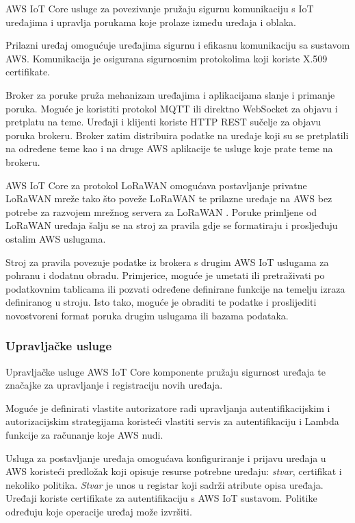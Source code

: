 AWS IoT Core usluge za povezivanje pružaju sigurnu komunikaciju s IoT uređajima i upravlja porukama koje prolaze između uređaja i oblaka.

Prilazni uređaj omogućuje uređajima sigurnu i efikasnu komunikaciju sa sustavom AWS. Komunikacija je osigurana sigurnosnim protokolima koji koriste  X.509 certifikate. 

Broker za poruke pruža mehanizam uređajima i aplikacijama slanje i primanje poruka. Moguće je koristiti protokol MQTT ili direktno WebSocket za objavu i pretplatu na teme. Uređaji i klijenti koriste HTTP REST sučelje za objavu poruka brokeru. Broker zatim distribuira podatke na uređaje koji su se pretplatili na određene teme kao i na druge AWS aplikacije te usluge koje prate teme na brokeru.

AWS IoT Core za protokol LoRaWAN omogućava postavljanje privatne LoRaWAN mreže tako što poveže LoRaWAN te prilazne uređaje na AWS bez potrebe za razvojem mrežnog servera za LoRaWAN . Poruke primljene od LoRaWAN uređaja šalju se na stroj za pravila  gdje se formatiraju i prosljeđuju ostalim AWS uslugama.

Stroj za pravila povezuje podatke iz brokera s drugim AWS IoT uslugama za pohranu i dodatnu obradu. Primjerice, moguće je umetati ili pretraživati po podatkovnim tablicama ili pozvati određene definirane funkcije na temelju izraza definiranog u stroju. Isto tako, moguće je obraditi te podatke i proslijediti novostvoreni format poruka drugim uslugama ili bazama podataka.

\subsubsection{Upravljačke usluge}

Upravljačke usluge AWS IoT Core komponente pružaju sigurnost uređaja te značajke za upravljanje i registraciju novih uređaja.

Moguće je definirati vlastite autorizatore radi upravljanja autentifikacijskim i autorizacijskim strategijama koristeći vlastiti servis za autentifikaciju i Lambda funkcije za računanje koje AWS nudi. 

Usluga za postavljanje  uređaja omogućava konfiguriranje i prijavu uređaja u AWS koristeći predložak koji opisuje resurse potrebne uređaju: \textit{stvar}, certifikat i nekoliko politika. \textit{Stvar} je unos u registar koji sadrži atribute opisa uređaja. Uređaji koriste certifikate za autentifikaciju s AWS IoT sustavom. Politike određuju koje operacije uređaj može izvršiti. 

